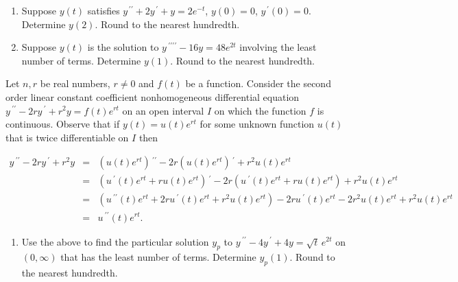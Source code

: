 \documentclass{ximera}
\begin{document}
\begin{enumerate}[label=(\arabic*)]


\item Suppose $y(t)$ satisfies $y^{\,\prime\prime}+2y^{\,\prime}+y=2e^{-t}$, $y(0)=0$, $y^{\,\prime}(0)=0$.  Determine $y(2)$.  Round to the nearest hundredth.







\item  Suppose $y(t)$ is the solution to $y\,^{\prime\prime\prime\prime}-16y=48e^{2t}$ involving the least number of terms.  Determine $y(1)$.  Round to the nearest hundredth.








\end{enumerate}


\newpage

Let $n,r$ be real numbers, $r\neq  0$ and $f(t)$ be a function.  Consider the second order linear constant coefficient nonhomogeneous differential equation\\ $y\,^{\prime\prime}-2r y\,^{\prime}+r^2 y=f(t) e^{rt}$ on an open interval $I$ on which the function $f$ is continuous.  Observe that if $y(t)=u(t)e^{rt}$ for some unknown function $u(t)$ that is twice differentiable on $I$ then

\begin{eqnarray*}
  y\,^{\prime\prime}-2r y\,^{\prime}+r^2 y &=& (u(t)e^{rt})\,^{\prime\prime}-2r (u(t)e^{rt})\,^{\prime}+r^2 u(t)e^{rt} \\
   &=& (u\,^{\prime}(t)e^{rt}+ru(t)e^{rt})\,^{\prime}-2r (u\,^{\prime}(t)e^{rt}+ru(t)e^{rt})+r^2 u(t)e^{rt} \\
   &=& (u\,^{\prime\prime}(t)e^{rt}+2ru\,^{\prime}(t)e^{rt}+r^2u(t)e^{rt})-2r u\,^{\prime}(t)e^{rt}-2r^2u(t)e^{rt}+r^2 u(t)e^{rt} \\
   &=& u\,^{\prime\prime}(t)e^{rt}.
\end{eqnarray*}

\begin{enumerate}

\item[(5)] Use the above to find the particular solution $y_p$ to $y\,^{\prime\prime}-4 y\,^{\prime}+4 y=  \sqrt{t}\,e^{2t}$ on $(0,\infty)$ that has the least number of terms.   Determine $y_p(1)$.  Round to the nearest hundredth.


\end{enumerate}
\end{document}
